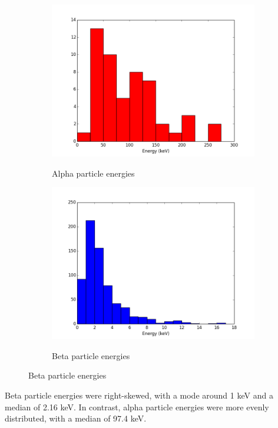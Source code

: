 \documentclass[notitlepage]{article}
\begin{document}
\begin{figure}[h!]
\centering
\ContinuedFloat 
\begin{subfigure}{.45\textwidth}
  \centering
  \includegraphics[width=\textwidth]{alphaenergy}
  \label{fig:alphaenergy}
  \caption{Alpha particle energies}
\end{subfigure}
\begin{subfigure}{.45\textwidth}
  \centering
  \includegraphics[width=\textwidth]{betaenergy}
  \label{fig:betaenergy}
  \caption{Beta particle energies}
\end{subfigure}
\end{figure}

Beta particle energies were right-skewed, with a mode around 1 keV and a median of 2.16 keV.  In contrast, alpha particle energies were more evenly distributed, with a median of 97.4 keV.
\end{document}
